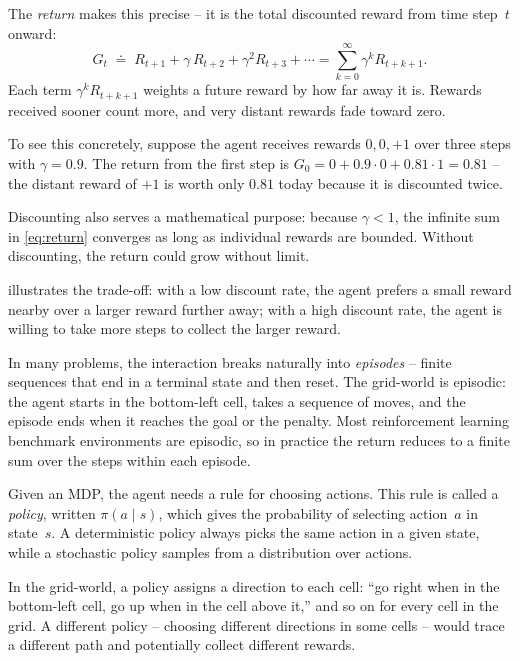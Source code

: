 \smallskip
The \emph{return} makes this precise -- it is the total discounted
reward from time step~$t$ onward:
%
\begin{equation}
\label{eq:return}
G_t \;\doteq\; R_{t+1} + \gamma\, R_{t+2} + \gamma^2 R_{t+3} + \cdots
  = \sum_{k=0}^{\infty} \gamma^k R_{t+k+1}.
\end{equation}
%
Each term $\gamma^k R_{t+k+1}$ weights a future reward by how
far away it is. Rewards received sooner count more, and very
distant rewards fade toward zero.

\smallskip
To see this concretely, suppose the agent receives rewards
$0, 0, +1$ over three steps with $\gamma = 0.9$. The return
from the first step is $G_0 = 0 + 0.9 \cdot 0 + 0.81 \cdot 1
= 0.81$ -- the distant reward of $+1$ is worth only $0.81$
today because it is discounted twice.

\smallskip
Discounting also serves a mathematical purpose: because
$\gamma < 1$, the infinite sum in \cref{eq:return} converges as
long as individual rewards are bounded. Without discounting, the
return could grow without limit.

\smallskip
{} illustrates the trade-off: with a low
discount rate, the agent prefers a small reward nearby over a
larger reward further away; with a high discount rate, the agent
is willing to take more steps to collect the larger reward.



\smallskip
In many problems, the interaction breaks naturally into
\emph{episodes} -- finite sequences that end in a terminal state
and then reset. The grid-world is episodic: the agent starts in
the bottom-left cell, takes a sequence of moves, and the episode ends
when it reaches the goal or the penalty. Most reinforcement
learning benchmark environments are episodic, so in practice the
return reduces to a finite sum over the steps within each episode.

\smallskip
Given an MDP, the agent needs a rule for choosing actions. This
rule is called a \emph{policy}, written $\pi(a \mid s)$, which
gives the probability of selecting action~$a$ in state~$s$. A
deterministic policy always picks the same action in a given state,
while a stochastic policy samples from a distribution over actions.

\smallskip
In the grid-world, a policy assigns a direction to each cell:
``go right when in the bottom-left cell, go up when in the cell
above it,'' and so on for every cell in the grid. A different
policy -- choosing different directions in some cells -- would
trace a different path and potentially collect different rewards.

